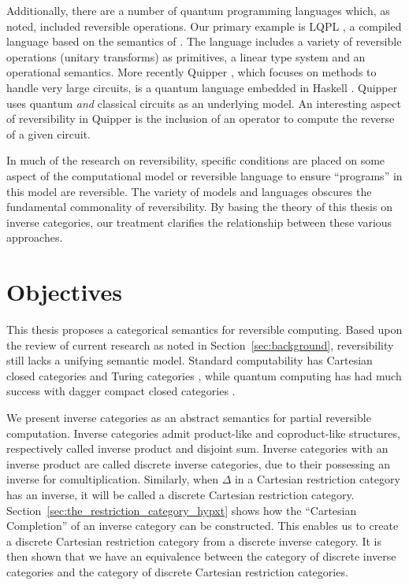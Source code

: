 Additionally, there are a number of quantum programming languages which, as noted, included
reversible operations. Our primary example is LQPL \cite{giles2007}, a compiled language based on the
semantics of \cite{selinger04:qpl}. The language includes a variety of reversible operations
(unitary transforms) as primitives, a linear type system and an operational semantics. More recently
Quipper \cite{green2013introduction,green2013quipper}, which focuses on methods to handle very large
circuits, is a quantum language embedded in Haskell \cite{peyton2003:haskell98}. Quipper uses quantum
\emph{and} classical circuits as an underlying model. An interesting aspect of reversibility in
Quipper is the inclusion of an operator to compute the reverse of a given circuit.

In much of the research on reversibility, specific conditions are placed on some aspect of the
computational model or reversible language to ensure ``programs'' in this model are reversible.
The variety of models and languages obscures the fundamental commonality of reversibility.
By basing the theory of this thesis on inverse categories, our treatment clarifies the relationship
between these various approaches.


\section{Objectives}
\label{sec:objectives}

This thesis proposes a categorical semantics for reversible computing. Based upon the review of
current research as noted in Section~\ref{sec:background}, reversibility still lacks a unifying
semantic model. Standard computability has Cartesian closed categories \cite{barr:ctcs} and Turing
categories \cite{cockett-hostra08-intro-to-turing}, while quantum computing has had much success
with dagger compact closed categories
\cite{selinger04:towardssemantics,selinger05:dagger,abramsky05:abstractscalars}.

We present inverse categories as an abstract semantics for partial reversible computation.
Inverse categories admit product-like and coproduct-like structures, respectively called
inverse product and disjoint sum. Inverse categories with an inverse product are called discrete
inverse categories, due to their possessing an inverse for comultiplication. Similarly, when
$\Delta$ in a Cartesian restriction category has an inverse, it will be called a discrete Cartesian
restriction category. Section~\ref{sec:the_restriction_category_hypxt} shows how the ``Cartesian
Completion'' of an inverse category can be constructed. This enables us to create a discrete
Cartesian restriction category from a discrete inverse category. It is then shown that we have an
equivalence between the category of discrete inverse categories and the category of discrete
Cartesian restriction categories.

